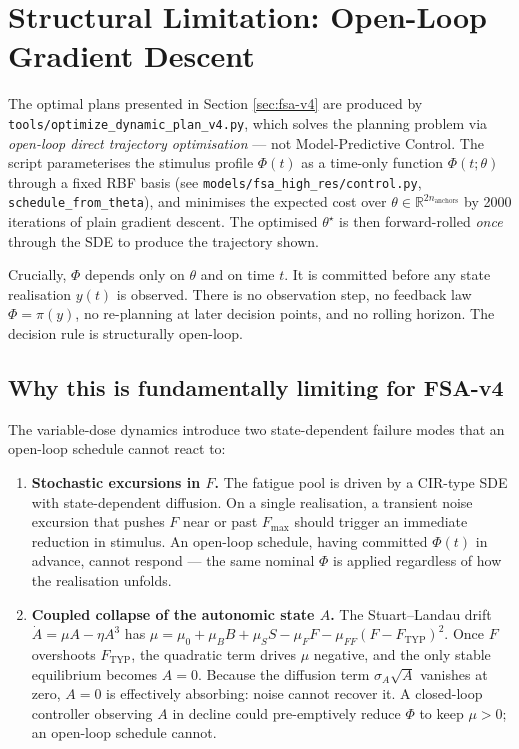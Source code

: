 \section{Structural Limitation: Open-Loop Gradient Descent} \label{sec:open_loop_limitation}

The optimal plans presented in Section \ref{sec:fsa-v4} are produced by \texttt{tools/optimize\_dynamic\_plan\_v4.py}, which solves the planning problem via \emph{open-loop direct trajectory optimisation} --- not Model-Predictive Control. The script parameterises the stimulus profile $\Phi(t)$ as a time-only function $\Phi(t;\theta)$ through a fixed RBF basis (see \texttt{models/fsa\_high\_res/control.py}, \texttt{schedule\_from\_theta}), and minimises the expected cost over $\theta \in \mathbb{R}^{2 n_{\text{anchors}}}$ by 2000 iterations of plain gradient descent. The optimised $\theta^\star$ is then forward-rolled \emph{once} through the SDE to produce the trajectory shown.

Crucially, $\Phi$ depends only on $\theta$ and on time $t$. It is committed before any state realisation $y(t)$ is observed. There is no observation step, no feedback law $\Phi = \pi(y)$, no re-planning at later decision points, and no rolling horizon. The decision rule is structurally open-loop.

\subsection{Why this is fundamentally limiting for FSA-v4}

The variable-dose dynamics introduce two state-dependent failure modes that an open-loop schedule cannot react to:

\begin{enumerate}
    \item \textbf{Stochastic excursions in $F$.} The fatigue pool is driven by a CIR-type SDE with state-dependent diffusion. On a single realisation, a transient noise excursion that pushes $F$ near or past $F_{\max}$ should trigger an immediate reduction in stimulus. An open-loop schedule, having committed $\Phi(t)$ in advance, cannot respond --- the same nominal $\Phi$ is applied regardless of how the realisation unfolds.
    \item \textbf{Coupled collapse of the autonomic state $A$.} The Stuart--Landau drift $\dot A = \mu A - \eta A^3$ has $\mu = \mu_0 + \mu_B B + \mu_S S - \mu_F F - \mu_{FF}(F - F_{\text{TYP}})^2$. Once $F$ overshoots $F_{\text{TYP}}$, the quadratic term drives $\mu$ negative, and the only stable equilibrium becomes $A = 0$. Because the diffusion term $\sigma_A \sqrt{A}$ vanishes at zero, $A = 0$ is effectively absorbing: noise cannot recover it. A closed-loop controller observing $A$ in decline could pre-emptively reduce $\Phi$ to keep $\mu > 0$; an open-loop schedule cannot.
\end{enumerate}

